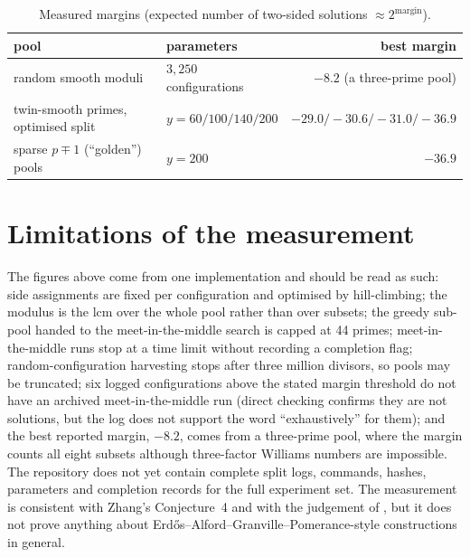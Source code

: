 \documentclass[11pt]{amsart}
\begin{document}
\begin{table}[h]
\centering\small
\begin{tabular}{llr}
\toprule
pool & parameters & best margin\\
\midrule
random smooth moduli & $3{,}250$ configurations & $-8.2$ (a three-prime pool)\\
twin-smooth primes, optimised split & $y=60/100/140/200$ & $-29.0/-30.6/-31.0/-36.9$\\
sparse $p\mp1$ (``golden'') pools & $y=200$ & $-36.9$\\
\bottomrule
\end{tabular}
\caption{Measured margins (expected number of two-sided solutions $\approx2^{\text{margin}}$).}\label{tab:margins}
\end{table}



\section{Limitations of the measurement}\label{sec:limits}
The figures above come from one implementation and should be read as such: side assignments are fixed per configuration and optimised by hill-climbing; the modulus is the lcm over the whole pool rather than over subsets; the greedy sub-pool handed to the meet-in-the-middle search is capped at 44 primes; meet-in-the-middle runs stop at a time limit without recording a completion flag; random-configuration harvesting stops after three million divisors, so pools may be truncated; six logged configurations above the stated margin threshold do not have an archived meet-in-the-middle run (direct checking confirms they are not solutions, but the log does not support the word ``exhaustively'' for them); and the best reported margin, $-8.2$, comes from a three-prime pool, where the margin counts all eight subsets although three-factor Williams numbers are impossible. The repository does not yet contain complete split logs, commands, hashes, parameters and completion records for the full experiment set. The measurement is consistent with Zhang's Conjecture~4 \cite{Zhang15} and with the judgement of \cite{BFW21}, but it does not prove anything about Erd\H{o}s--Alford--Granville--Pomerance-style constructions in general.
\end{document}
